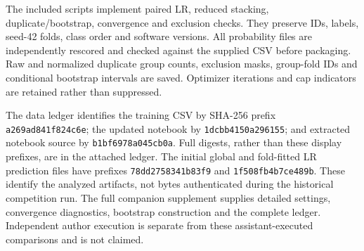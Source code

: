 The included scripts implement paired LR, reduced stacking, duplicate/bootstrap, convergence and exclusion checks. They preserve IDs, labels, seed-42 folds, class order and software versions. All probability files are independently rescored and checked against the supplied CSV before packaging. Raw and normalized duplicate group counts, exclusion masks, group-fold IDs and conditional bootstrap intervals are saved. Optimizer iterations and cap indicators are retained rather than suppressed.

The data ledger identifies the training CSV by SHA-256 prefix \texttt{a269ad841f824c6e}; the updated notebook by \texttt{1dcbb4150a296155}; and extracted notebook source by \texttt{b1bf6978a045cb0a}. Full digests, rather than these display prefixes, are in the attached ledger. The initial global and fold-fitted LR prediction files have prefixes \texttt{78dd2758341b83f9} and \texttt{1f508fb4b7ce489b}. These identify the analyzed artifacts, not bytes authenticated during the historical competition run. The full companion supplement supplies detailed settings, convergence diagnostics, bootstrap construction and the complete ledger. Independent author execution is separate from these assistant-executed comparisons and is not claimed.
